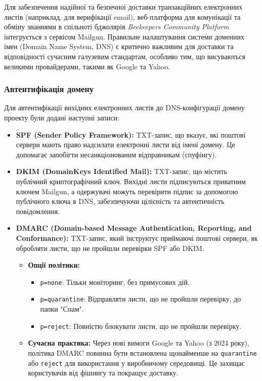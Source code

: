 Для забезпечення надійної та безпечної доставки транзакційних електронних листів (наприклад, для верифікації email), веб-платформа для комунікації та обміну знаннями в спільноті бджолярів \textit{Beekeepers Community Platform} інтегрується з сервісом Mailgun. Правильне налаштування системи доменних імен (Domain Name System, DNS) є критично важливим для доставки та відповідності сучасним галузевим стандартам, особливо тим, що висуваються великими провайдерами, такими як Google та Yahoo.

\subsubsection{Автентифікація домену}

Для автентифікації вихідних електронних листів до DNS-конфігурації домену проекту були додані наступні записи:

\begin{itemize}
    \item \textbf{SPF (Sender Policy Framework):} TXT-запис, що вказує, які поштові сервери мають право надсилати електронні листи від імені домену. Це допомагає запобігти несанкціонованим відправникам (спуфінгу).
    \item \textbf{DKIM (DomainKeys Identified Mail):} TXT-запис, що містить публічний криптографічний ключ. Вихідні листи підписуються приватним ключем Mailgun, а одержувачі можуть перевірити підпис за допомогою публічного ключа в DNS, забезпечуючи цілісність та автентичність повідомлення.
    \item \textbf{DMARC (Domain-based Message Authentication, Reporting, and Conformance):} TXT-запис, який інструктує приймаючі поштові сервери, як обробляти листи, що не пройшли перевірки SPF або DKIM.
        \begin{itemize}
            \item \textbf{Опції політики:}
                \begin{itemize}
                    \item \texttt{p=none}: Тільки моніторинг, без примусових дій.
                    \item \texttt{p=quarantine}: Відправляти листи, що не пройшли перевірку, до папки "Спам".
                    \item \texttt{p=reject}: Повністю блокувати листи, що не пройшли перевірку.
                \end{itemize}
            \item \textbf{Сучасна практика:} Через нові вимоги Google та Yahoo (з 2024 року), політика DMARC повинна бути встановлена щонайменше на \texttt{quarantine} або \texttt{reject} для використання у виробничому середовищі. Це захищає користувачів від фішингу та покращує доставку.
        \end{itemize}
\end{itemize}

